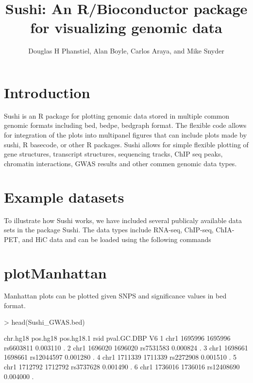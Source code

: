 \documentclass{article}
\title{Sushi: An R/Bioconductor package for visualizing genomic data}
\author{Douglas H Phanstiel, Alan Boyle, Carlos Araya, and Mike Snyder}
\begin{document}

\maketitle
\section{Introduction}

Sushi is an R package for plotting genomic data stored in multiple common genomic formats including bed, bedpe, bedgraph format. The flexible code allows for integration of the plots into multipanel figures that can include plots made by sushi, R basecode, or other R packages.  Sushi allows for simple flexible plotting of gene structures, transcript structures, sequencing tracks, ChIP seq peaks, chromatin interactions, GWAS results and other commen genomic data types.   


\section{Example datasets}
To illustrate how Sushi works, we have included several publicaly available data sets in the package Sushi. The data types include RNA-seq, ChIP-seq, ChIA-PET, and HiC data and can be loaded using the following commands

\begin{Schunk}
\end{Schunk}

\section{plotManhattan}

Manhattan plots can be plotted given SNPS and significance values in bed format.

\begin{Schunk}
\begin{Sinput}
> head(Sushi_GWAS.bed)
\end{Sinput}
\begin{Soutput}
  chr.hg18 pos.hg18 pos.hg18.1       rsid pval.GC.DBP V6
1     chr1  1695996    1695996  rs6603811    0.003110  .
2     chr1  1696020    1696020  rs7531583    0.000824  .
3     chr1  1698661    1698661 rs12044597    0.001280  .
4     chr1  1711339    1711339  rs2272908    0.001510  .
5     chr1  1712792    1712792  rs3737628    0.001490  .
6     chr1  1736016    1736016 rs12408690    0.004000  .
\end{Soutput}
\end{Schunk}
\end{document}
